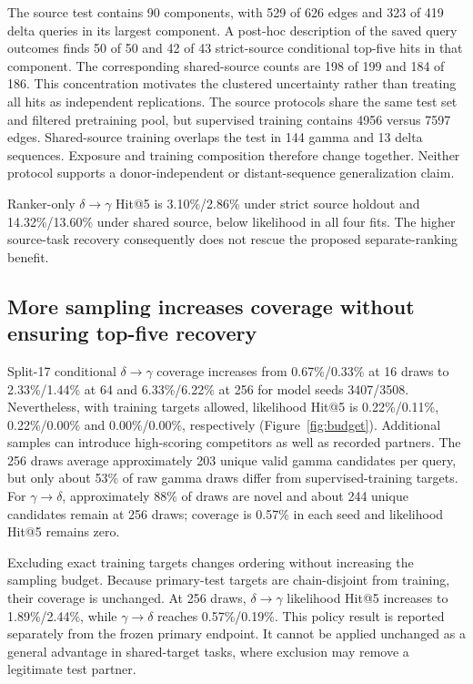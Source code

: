 \documentclass[12pt]{article}
\newcommand{\gtd}{\mbox{\ensuremath{\gamma\!\rightarrow\!\delta}}}
\newcommand{\dtg}{\mbox{\ensuremath{\delta\!\rightarrow\!\gamma}}}
\begin{document}
The source test contains 90 components, with 529 of 626 edges and 323 of 419
delta queries in its largest component. A post-hoc description of the saved
query outcomes finds 50 of 50 and 42 of 43 strict-source conditional top-five
hits in that component. The corresponding shared-source counts are 198 of 199
and 184 of 186. This concentration motivates the clustered uncertainty rather
than treating all hits as independent replications. The source protocols share
the same test set and filtered pretraining pool, but supervised training contains
4956 versus 7597 edges. Shared-source training overlaps the test in 144 gamma
and 13 delta sequences. Exposure and training composition therefore change
together. Neither protocol supports a donor-independent or distant-sequence
generalization claim.

Ranker-only \dtg{} Hit@5 is 3.10\%/2.86\% under strict source holdout and
14.32\%/13.60\% under shared source, below likelihood in all four fits.
The higher source-task recovery consequently does not rescue the proposed
separate-ranking benefit.

\subsection{More sampling increases coverage without ensuring top-five recovery}
Split-17 conditional \dtg{} coverage increases from 0.67\%/0.33\% at 16
draws to 2.33\%/1.44\% at 64 and 6.33\%/6.22\% at 256 for model seeds
3407/3508. Nevertheless, with training targets allowed, likelihood Hit@5 is
0.22\%/0.11\%, 0.22\%/0.00\% and 0.00\%/0.00\%, respectively
(Figure~\ref{fig:budget}). Additional samples can introduce high-scoring
competitors as well as recorded partners. The 256 draws average approximately
203 unique valid gamma candidates per query, but only about 53\% of raw
gamma draws differ from supervised-training targets. For \gtd{}, approximately
88\% of draws are novel and about 244 unique candidates remain at 256 draws;
coverage is 0.57\% in each seed and likelihood Hit@5 remains zero.

Excluding exact training targets changes ordering without increasing the
sampling budget. Because primary-test targets are chain-disjoint from training,
their coverage is unchanged. At 256 draws, \dtg{} likelihood Hit@5 increases
to 1.89\%/2.44\%, while \gtd{} reaches 0.57\%/0.19\%. This policy result
is reported separately from the frozen primary endpoint. It cannot be applied
unchanged as a general advantage in shared-target tasks, where exclusion may
remove a legitimate test partner.
\end{document}
